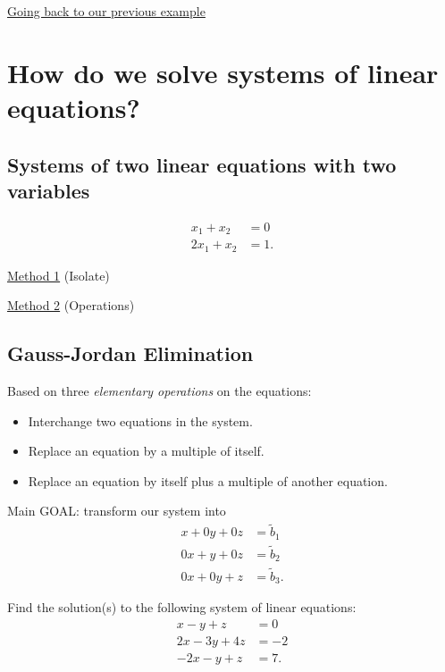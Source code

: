 \documentclass[12pt,a4paper]{article}
\newcommand{\spaceP}{\vspace*{0.5cm}}
\newcounter{example}[section]
\begin{document}
\spaceP

\noindent\underline{Going back to our previous example} 

\newpage

\section{How do we solve systems of linear equations?}

\subsection{Systems of two linear equations with two variables}

	\begin{align*}
	x_1 + x_2 & = 0 \\
	2 x_1 + x_2 & = 1 .
	\end{align*}

\underline{Method 1} (Isolate)
\vspace*{6cm}

\underline{Method 2} (Operations)
\vspace*{6cm}

\subsection{Gauss-Jordan Elimination}

Based on three \textit{elementary operations} on the equations:
	\begin{itemize}
	\item Interchange two equations in the system.
	\item Replace an equation by a multiple of itself.
	\item Replace an equation by itself plus a multiple of another equation.
	\end{itemize}
	
\noindent Main GOAL: transform our system into
	\begin{align*}
	x + 0 y + 0 z &= \tilde{b}_1 \\
	0x + y + 0 z &= \tilde{b}_2 \\
	0x + 0y + z &= \tilde{b}_3 .
	\end{align*}
	\newpage
	
\begin{example}\label{Example:One}
Find the solution(s) to the following system of linear equations:
	\begin{align*}
	x - y + z & = 0 \\
	2x - 3y + 4z & = -2 \\
	-2x - y + z & = 7.
	\end{align*}
\end{example}
\end{document}
